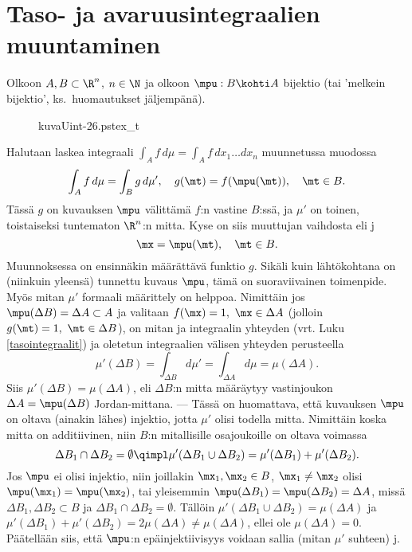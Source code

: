 \section[Taso- ja avaruusintegraalien muuntaminen]{Taso- ja avaruusintegraalien \\ 
muuntaminen} 
\label{muuttujan vaihto integraaleissa}
\alku
{}

Olkoon $A,B\subset\R^n$, $n\in\N$ ja olkoon $\mpu:B \kohti A$ bijektio (tai 'melkein bijektio',
ks.\ huomautukset jäljempänä).
\begin{figure}[H]
\begin{center}
{kuvaUint-26.pstex_t}
\end{center}
\end{figure}
Halutaan laskea integraali $\int_A f\,d\mu = \int_A f\,dx_1\ldots dx_n$ muunnetussa muodossa
\[
\int_A f\,d\mu=\int_B g\,d\mu', \quad g(\mt)=f(\mpu(\mt)), \quad \mt \in B.
\]
Tässä $g$ on kuvauksen $\mpu$ välittämä $f$:n vastine $B$:ssä, ja $\mu'$ on toinen, toistaiseksi
tuntematon $\R^n$:n mitta. Kyse on siis muuttujan vaihdosta eli j
\[
\mx=\mpu(\mt),\quad \mt\in B.
\]
Muunnoksessa on ensinnäkin määrättävä funktio $g$. Sikäli kuin lähtökohtana on
(niinkuin yleensä) tunnettu kuvaus $\mpu$, tämä on suoraviivainen toimenpide. Myös mitan
$\mu'$ formaali määrittely on helppoa. Nimittäin jos $\mpu(\Delta B)=\Delta A \subset A$ ja
valitaan $f(\mx)=1,\ \mx\in \Delta A$ (jolloin $g(\mt)=1,\ \mt\in \Delta B$), on mitan ja
integraalin yhteyden (vrt. Luku \ref{tasointegraalit}) ja oletetun integraalien välisen
yhteyden perusteella
\[
\mu'(\Delta B)=\int_{\Delta B} d\mu'=\int_{\Delta A} d\mu=\mu(\Delta A).
\]
Siis $\mu'(\Delta B)=\mu(\Delta A)$, eli $\Delta B$:n mitta määräytyy vastinjoukon
$\Delta A=\mpu(\Delta B)$ Jordan-mittana. --- Tässä on huomattava, että kuvauksen $\mpu$ on
oltava (ainakin lähes) injektio, jotta $\mu'$ olisi todella mitta. Nimittäin koska mitta on
additiivinen, niin $B$:n mitallisille osajoukoille on oltava voimassa
\[
\Delta B_1\cap\Delta B_2=\emptyset \qimpl
       \mu'(\Delta B_1\cup\Delta B_2)=\mu'(\Delta B_1)+\mu'(\Delta B_2).
\]
Jos $\mpu$ ei olisi injektio, niin joillakin $\mx_1,\mx_2 \in B$, $\mx_1\neq\mx_2$ olisi
$\mpu(\mx_1)=\mpu(\mx_2)$, tai yleisemmin $\mpu(\Delta B_1)=\mpu(\Delta B_2)=\Delta A$, missä
$\Delta B_1,\Delta B_2 \subset B$ ja $\Delta B_1 \cap \Delta B_2 =\emptyset$. Tällöin
$\mu'(\Delta B_1\cup\Delta B_2)=\mu(\Delta A)$ ja
$\mu'(\Delta B_1)+\mu'(\Delta B_2)=2\mu(\Delta A)\neq\mu(\Delta A)$, ellei ole
$\mu(\Delta A)=0$. Päätellään siis, että $\mpu$:n epäinjektiivisyys voidaan sallia
 (mitan $\mu'$ suhteen)  j.

